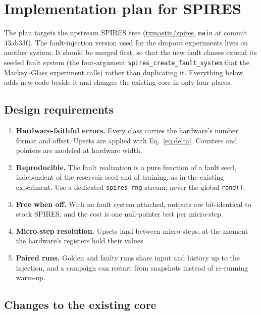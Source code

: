 \documentclass[11pt,a4paper]{article}
\begin{document}
\section{Implementation plan for SPIRES}
\label{sec:impl}

The plan targets the upstream SPIRES tree (\href{https://github.com/txmastin/spires}{txmastin/spires}, \texttt{main} at commit 43ab33f). The fault-injection version used for the dropout experiments lives on another system. It should be merged first, so that the new fault classes extend its seeded fault system (the four-argument \texttt{spires\_create\_fault\_system} that the Mackey--Glass experiment calls) rather than duplicating it. Everything below adds new code beside it and changes the existing core in only four places.

\subsection{Design requirements}

\begin{enumerate}
  \item \textbf{Hardware-faithful errors.} Every class carries the hardware's number format and offset. Upsets are applied with Eq.~\eqref{eq:delta}. Counters and pointers are modeled at hardware width.
  \item \textbf{Reproducible.} The fault realization is a pure function of a fault seed, independent of the reservoir seed and of training, as in the existing experiment. Use a dedicated \texttt{spires\_rng} stream; never the global \texttt{rand()}.
  \item \textbf{Free when off.} With no fault system attached, outputs are bit-identical to stock SPIRES, and the cost is one null-pointer test per micro-step.
  \item \textbf{Micro-step resolution.} Upsets land between micro-steps, at the moment the hardware's registers hold their values.
  \item \textbf{Paired runs.} Golden and faulty runs share input and history up to the injection, and a campaign can restart from snapshots instead of re-running warm-up.
\end{enumerate}

\subsection{Changes to the existing core}
\end{document}
